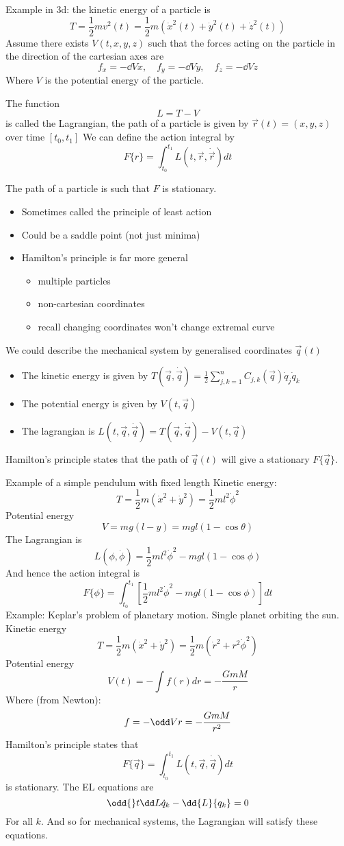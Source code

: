 \documentclass{E:/Documents/Latex/myassignment}
\begin{document}
Example in 3d: the kinetic energy of a particle is
\[T = \frac12 mv^2(t) = \frac12 m \left(\dot x^2(t) + \dot y^2(t) + \dot z^2(t)\right)\]
Assume there exists $V(t,x,y,z)$ such that the forces acting on the particle in the direction of the cartesian axes are
\[f_x = -\dd Vx, \quad f_y = -\dd Vy, \quad f_z = -\dd Vz\]
Where $V$ is the potential energy of the particle.

The function
\[L = T-V\]
is called the Lagrangian, the path of a particle is given by $\vec r(t) = (x,y,z)$ over time $[t_0,t_1]$
We can define the action integral by
\[F\{r\} = \int_{t_0}^{t_1} L(t,\vec r,\dot{\vec r}) dt\]

The path of a particle is such that $F$ is stationary.
\begin{itemize}
	\item Sometimes called the principle of least action
	\item Could be a saddle point (not just minima)
	\item Hamilton's principle is far more general
	\begin{itemize}
		\item multiple particles
		\item non-cartesian coordinates
		\item recall changing coordinates won't change extremal curve
	\end{itemize}
\end{itemize}

We could describe the mechanical system by generalised coordinates $\vec q(t)$
\begin{itemize}
	\item The kinetic energy is given by $T(\vec q, \dot{\vec q}) = \frac12 \sum_{j,k=1}^n C_{j,k} (\vec q) \dot{q}_j \dot {q}_k$
	\item The potential energy is given by $V(t,\vec q)$
	\item The lagrangian is $L(t,\vec q,\dot{\vec q}) = T(\vec q,\dot{\vec q}) - V(t,\vec q)$
\end{itemize}
Hamilton's principle states that the path of $\vec q(t)$ will give a stationary $F\{\vec q\}$.

Example of a simple pendulum with fixed length
Kinetic energy:
\[T = \frac12 m(\dot x^2 + \dot y^2) = \frac12 m l^2 \dot \phi ^2\]
Potential energy
\[V = mg(l-y) = mgl(1-\cos\theta)\]
The Lagrangian is
\[L(\phi,\dot\phi) = \frac12 ml^2 \dot\phi^2 - mgl(1-\cos\phi)\]
And hence the action integral is
\[F\{\phi\} = \int_{t_0}^{t_1} \left[\frac12 ml^2\dot\phi^2 - mgl(1-\cos\phi)\right] dt\]
Example: Keplar's problem of planetary motion.
Single planet orbiting the sun.
Kinetic energy
\[T = \frac12 m \left(\dot x^2 + \dot y^2\right) = \frac12 m (\dot r^2 + r^2\dot\phi^2)\]
Potential energy
\[V(t) = -\int f(r) dr = -\frac{GmM}{r}\]
Where (from Newton):
\[f = -\odd Vr = -\frac{GmM}{r^2}\]
Hamilton's principle states that 
\[F\{\vec q\} = \int_{t_0}^{t_1} L(t,\vec q,\dot{\vec q}) dt\]
is stationary.
The EL equations are
\[\odd{}t \dd L{\dot q_k} - \dd{L}{q_k} = 0\]
For all $k$. And so for mechanical systems, the Lagrangian will satisfy these equations.
\end{document}
